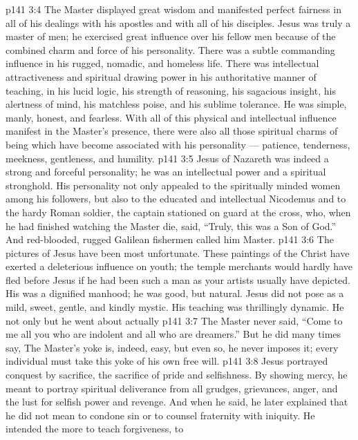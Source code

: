 \vs p141 3:4 \pc The Master displayed great wisdom and manifested perfect fairness in all of his dealings with his apostles and with all of his disciples. Jesus was truly a master of men; he exercised great influence over his fellow men because of the combined charm and force of his personality. There was a subtle commanding influence in his rugged, nomadic, and homeless life. There was intellectual attractiveness and spiritual drawing power in his authoritative manner of teaching, in his lucid logic, his strength of reasoning, his sagacious insight, his alertness of mind, his matchless poise, and his sublime tolerance. He was simple, manly, honest, and fearless. With all of this physical and intellectual influence manifest in the Master’s presence, there were also all those spiritual charms of being which have become associated with his personality --- patience, tenderness, meekness, gentleness, and humility.
\vs p141 3:5 Jesus of Nazareth was indeed a strong and forceful personality; he was an intellectual power and a spiritual stronghold. His personality not only appealed to the spiritually minded women among his followers, but also to the educated and intellectual Nicodemus and to the hardy Roman soldier, the captain stationed on guard at the cross, who, when he had finished watching the Master die, said, “Truly, this was a Son of God.” And red\hyp{}blooded, rugged Galilean fishermen called him Master.
\vs p141 3:6 The pictures of Jesus have been most unfortunate. These paintings of the Christ have exerted a deleterious influence on youth; the temple merchants would hardly have fled before Jesus if he had been such a man as your artists usually have depicted. His was a dignified manhood; he was good, but natural. Jesus did not pose as a mild, sweet, gentle, and kindly mystic. His teaching was thrillingly dynamic. He not only  but he went about actually 
\vs p141 3:7 The Master never said, “Come to me all you who are indolent and all who are dreamers.” But he did many times say,  The Master’s yoke is, indeed, easy, but even so, he never imposes it; every individual must take this yoke of his own free will.
\vs p141 3:8 Jesus portrayed conquest by sacrifice, the sacrifice of pride and selfishness. By showing mercy, he meant to portray spiritual deliverance from all grudges, grievances, anger, and the lust for selfish power and revenge. And when he said,  he later explained that he did not mean to condone sin or to counsel fraternity with iniquity. He intended the more to teach forgiveness, to 
